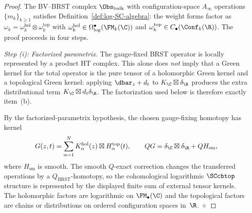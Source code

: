 \begin{proof}
The BV--BRST complex $\Obs_{\mathrm{bulk}}$ with configuration-space $A_\infty$ operations $\{m_k\}_{k \ge 1}$ satisfies Definition~\ref{def:log-SC-algebra}: the weight forms factor as $\omega_k = \omega_k^{\mathrm{hol}} \otimes \omega_k^{\mathrm{top}}$ with $\omega_k^{\mathrm{hol}} \in \Omega^\bullet_{\log}(\FM_k(\C))$ and $\omega_k^{\mathrm{top}} \in C_\bullet(\Conf_k(\R))$. The proof proceeds in four steps.

\medskip
\emph{Step (i): Factorized parametrix.}
The gauge-fixed BRST operator is locally represented by a product
HT complex. This alone does \emph{not} imply that a Green kernel for
the total operator is the pure tensor of a holomorphic Green kernel
and a topological Green kernel: applying
$\dbar_z+d_t$ to $K_\C\boxtimes\delta_\R$ produces the extra
distributional term $K_\C\boxtimes d_t\delta_\R$. The factorization
used below is therefore exactly item~\textup{(b)}.

By the factorized-parametrix hypothesis, the chosen gauge-fixing
homotopy has kernel
\[
 G(z,t)=\sum_{\alpha=1}^{N}
 K_\alpha^{\mathrm{hol}}(z)\boxtimes H_\alpha^{\mathrm{top}}(t),
 \qquad
 QG=\delta_{\C}\boxtimes\delta_{\R}+QH_{\mathrm{sm}},
\]
where $H_{\mathrm{sm}}$ is smooth. The smooth $Q$-exact correction
changes the transferred operations by a $Q_{\mathrm{BRST}}$-homotopy,
so the cohomological logarithmic $\SCchtop$ structure is represented
by the displayed finite sum of external tensor kernels. The
holomorphic factors are logarithmic on $\FM_\bullet(\C)$ and the
topological factors are chains or distributions on ordered
configuration spaces in~$\R$. \hfill$\diamond$


\end{proof}
